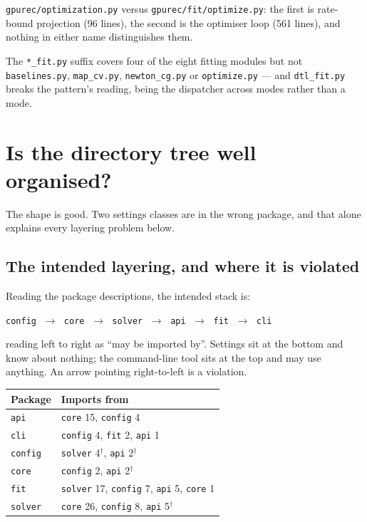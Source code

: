 \documentclass[11pt]{article}
\newcommand{\dir}[1]{\nolinkurl{#1}}
\begin{document}
\dir{gpurec/optimization.py} versus \dir{gpurec/fit/optimize.py}: the first is
rate-bound projection (96 lines), the second is the optimiser loop (561 lines),
and nothing in either name distinguishes them.

The \texttt{*\_fit.py} suffix covers four of the eight fitting modules but not
\dir{baselines.py}, \dir{map\_cv.py}, \dir{newton\_cg.py} or
\dir{optimize.py} --- and \dir{dtl\_fit.py} breaks the pattern's reading, being
the dispatcher across modes rather than a mode.

\section{Is the directory tree well organised?}
\label{sec:imports}

The shape is good.  Two settings classes are in the wrong package, and that
alone explains every layering problem below.

\subsection{The intended layering, and where it is violated}

Reading the package descriptions, the intended stack is:

\begin{center}
\texttt{config} $\;\rightarrow\;$ \texttt{core} $\;\rightarrow\;$
\texttt{solver} $\;\rightarrow\;$ \texttt{api} $\;\rightarrow\;$
\texttt{fit} $\;\rightarrow\;$ \texttt{cli}
\end{center}

reading left to right as ``may be imported by''.  Settings sit at the bottom and
know about nothing; the command-line tool sits at the top and may use anything.
An arrow pointing right-to-left is a violation.

\begin{center}
\begin{tabular}{@{}ll@{}}
\toprule
Package & Imports from \\
\midrule
\texttt{api}    & \texttt{core} 15, \texttt{config} 4 \\
\texttt{cli}    & \texttt{config} 4, \texttt{fit} 2, \texttt{api} 1 \\
\texttt{config} & \texttt{solver} 4$^\dagger$, \texttt{api} 2$^\dagger$ \\
\texttt{core}   & \texttt{config} 2, \texttt{api} 2$^\dagger$ \\
\texttt{fit}    & \texttt{solver} 17, \texttt{config} 7, \texttt{api} 5, \texttt{core} 1 \\
\texttt{solver} & \texttt{core} 26, \texttt{config} 8, \texttt{api} 5$^\dagger$ \\
\bottomrule
\end{tabular}
\end{center}
\end{document}

